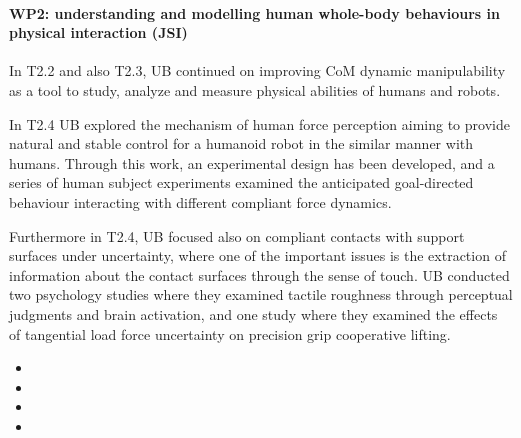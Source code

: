  
\paragraph*{WP2: understanding and modelling human whole-body behaviours in physical interaction (JSI)}

In T2.2 and also T2.3, UB continued on improving CoM dynamic manipulability as a tool to study, analyze and measure physical abilities of humans and robots.

In T2.4 UB explored the mechanism of human force perception aiming to provide natural and stable control for a humanoid robot in the similar manner with humans. Through this work, an experimental design has been developed, and a series of human subject experiments examined the anticipated goal-directed behaviour interacting with different compliant force dynamics.

Furthermore in T2.4, UB focused also on compliant contacts with support surfaces under uncertainty, where one of the important issues is the extraction of information about the contact surfaces through the sense of touch. UB conducted two psychology studies where they examined tactile roughness through perceptual judgments and brain activation, and one study where they examined the effects of tangential load force uncertainty on precision grip cooperative lifting.




\begin{itemize}

\item 
\item 
\item 
\item 

 \end{itemize}
